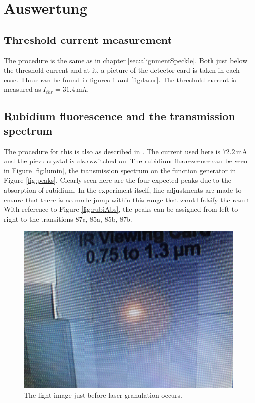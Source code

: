 \section{Auswertung}
\label{sec:Auswertung}

\subsection{Threshold current measurement}

The procedure is the same as in chapter \ref{sec:alignmentSpeckle}. Both just below the threshold current and at it, a picture of the detector card is taken in each case. 
These can be found in figures \ref{fig:led} and \ref{fig:laser}. The threshold current is measured as $I_{thr} = 31.4 \,\si{\milli\ampere}$.

\subsection{Rubidium fluorescence and the transmission spectrum}

The procedure for this is also as described in \label{sec:DurchRubiFluor}. The current used here is $72.2 \,\si{\milli\ampere}$ and the piezo crystal is also switched on. 
The rubidium fluorescence can be seen in Figure \ref{fig:lumin}, the transmission spectrum on the function generator in Figure \ref{fig:peaks}.
Clearly seen here are the four expected peaks due to the absorption of rubidium. In the experiment itself, fine adjustments are made to ensure that there is no mode jump within this range that would falsify the result.
With reference to Figure \ref{fig:rubiAbs}, the peaks can be assigned from left to right to the transitions 87a, 85a, 85b, 87b.

\begin{figure}[H]
  \centering
  \includegraphics[width=.8\textwidth]{content/led_card.jpeg}
  \caption{The light image just before laser granulation occurs.}
  \label{fig:led}
\end{figure}

